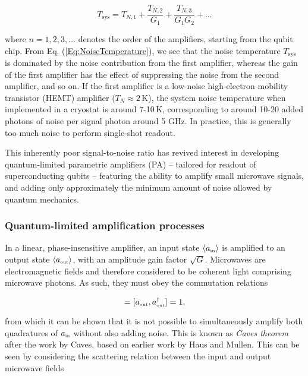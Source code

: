 \documentclass[aip,apr,twocolumn,showpacs,superscriptaddress,groupedaddress,nofootinbib,reprint]{revtex4-1}  %
\begin{document}
\begin{equation}
T_{\text{sys}} = T_{N,1} + \frac{T_{N,2}}{G_1} + \frac{T_{N,3}}{G_1 G_2} + ...
\label{Eq:NoiseTemperature}
\end{equation}

\noindent where $n = 1,2,3,...$ denotes the order of the amplifiers, starting from the qubit chip. From Eq. (\ref{Eq:NoiseTemperature}), we see that the noise temperature $T_{\text{sys}}$ is dominated by the noise contribution from the first amplifier, whereas the gain of the first amplifier has the effect of suppressing the noise from the second amplifier, and so on. If the first amplifier is a low-noise high-electron mobility transistor (HEMT) amplifier ($T_N \approx 2\,$K), the system noise temperature when implemented in a cryostat is around 7-10$\,$K, corresponding to around 10-20 added photons of noise per signal photon around 5 GHz. In practice, this is generally too much noise to perform single-shot readout.

This inherently poor signal-to-noise ratio has revived interest in developing quantum-limited parametric amplifiers (PA) -- tailored for readout of superconducting qubits -- featuring the ability to amplify small microwave signals, and adding only approximately the minimum amount of noise allowed by quantum mechanics\cite{Caves1982,Haus2000,Clerk2010}.

\subsubsection{Quantum-limited amplification processes}

In a linear, phase-insensitive amplifier, an input state $\langle a_{\mbox{\tiny{in}}}\rangle$ is amplified to an output state $\langle a_{\mbox{\tiny{out}}}\rangle$, with an amplitude gain factor $\sqrt{G}$. Microwaves are electromagnetic fields and therefore considered to be coherent light comprising microwave photons. As such, they must obey the commutation relations\cite{Haus1962,Caves1982,Haus2000,FlurinPhD2014}

\begin{equation}
[a_{\mbox{\tiny{in}}},a_{\mbox{\tiny{in}}}^{\dagger}] = [a_{\mbox{\tiny{out}}},a_{\mbox{\tiny{out}}}^{\dagger}] = 1,
\label{Eq:Commutation}
\end{equation}

\noindent from which it can be shown that it is not possible to simultaneously amplify both quadratures of $a_{\mbox{\tiny{in}}}$ without also adding noise. This is known as \textit{Caves theorem} after the work by Caves\cite{Caves1982}, based on earlier work by Haus and Mullen\cite{Haus1962}. This can be seen by considering the scattering relation between the input and output microwave fields
\end{document}
